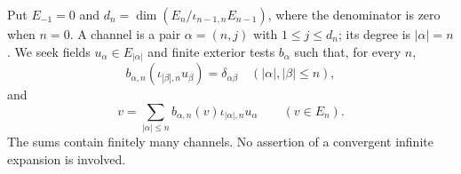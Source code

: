 Put $E_{-1}=0$ and
$d_n=\dim(E_n/\iota_{n-1,n}E_{n-1})$, where the denominator is zero
when $n=0$. A channel is a pair $\alpha=(n,j)$ with $1\leq j\leq d_n$;
its degree is $|\alpha|=n$. We seek fields $u_\alpha\in E_{|\alpha|}$
and finite exterior tests $b_\alpha$ such that, for every $n$,
\begin{equation}\label{eq:ope-biorthogonal}
 b_{\alpha,n}(\iota_{|\beta|,n}u_\beta)=\delta_{\alpha\beta}
       \quad(|\alpha|,|\beta|\leq n),
\end{equation}
and
\begin{equation}\label{eq:ope-rebuild}
 v=\sum_{|\alpha|\leq n}b_{\alpha,n}(v)
                       \iota_{|\alpha|,n}u_\alpha\qquad(v\in E_n).
\end{equation}
The sums contain finitely many channels. No assertion of a convergent
infinite expansion is involved.

